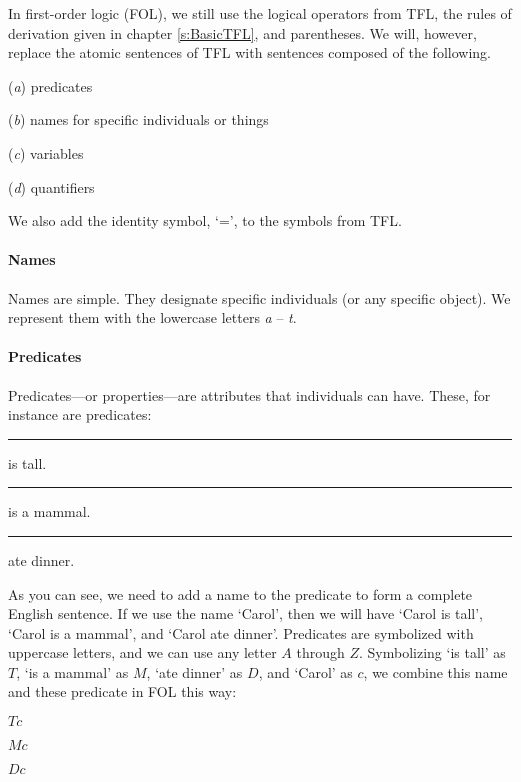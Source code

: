 In first-order logic (FOL), we still use the logical operators from TFL, the rules of derivation given in chapter \ref{s:BasicTFL}, and parentheses. We will, however, replace the atomic sentences of TFL with sentences composed of the following.

\begin{ebullet}
	\item[(\textit{a})] predicates
	\item[(\textit{b})] names for specific individuals or things 
	\item[(\textit{c})] variables 
	\item[(\textit{d})] quantifiers
\end{ebullet}
We also add the identity symbol, ‘=’, to the symbols from TFL.  


\paragraph{Names}

Names are simple. They designate specific individuals (or any specific object). We represent them with the lowercase letters \textit{a} -- \textit{t}.

\paragraph{Predicates}

Predicates---or properties---are attributes that individuals can have. These, for instance are predicates:

\begin{ebullet}
	\item[] \rule{1cm}{0.15mm} is tall.
	\item[] \rule{1cm}{0.15mm} is a mammal.
	\item[] \rule{1cm}{0.15mm} ate dinner.
\end{ebullet}

As you can see, we need to add a name to the predicate to form a complete English sentence. If we use the name `Carol’, then we will have ‘Carol is tall’, ‘Carol is a mammal’, and ‘Carol ate dinner’.
Predicates are symbolized with uppercase letters, and we can use any letter $A$ through $Z$. Symbolizing `is tall' as $T$, `is a mammal' as $M$, `ate dinner' as $D$, and `Carol' as $c$, we combine this name and these predicate in FOL this way:

\begin{ebullet}
	\item[] $Tc$
	\item[] $Mc$
	\item[] $Dc$
\end{ebullet}

